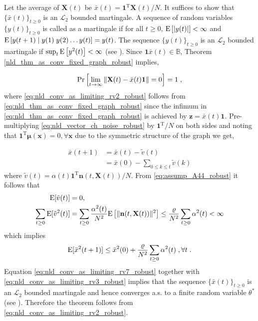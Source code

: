 \documentclass[onecolumn, draft, 12pt]{IEEEtran}
\newcommand{\vrho}{\ensuremath{\varrho}}
\newcommand{\E}{{\rm E}}
\newcommand{\Cs}{\mathbb{B}}
\newcommand{\Ltwo}{\mathcal{L}_{2}}
\newcommand{\onevect}{\mathbf{1}}
\newcommand{\onevectT}{\mathbf{1}^{\mathrm{T}}}
\newcommand{\xbar}{\bar{x}}
\newcommand{\X}{\mathbf{X}}
\newcommand{\xX}{\mathbf{x}}
\newcommand{\Z}{\mathbf{z}}
\newcommand{\cval}{\ensuremath{\theta^{*}}}
\newcommand{\mx}{\mathbf{\boldsymbol\mu}(\mathbf{x})}
\newcommand{\nv}{\mathbf{n}}
\begin{document}
\begin{IEEEproof}
Let the average of $\X(t)$ be $\xbar(t)=\onevectT \X(t) / N$. It suffices to show that $\{\xbar(t)\}_{t \geq 0}$ is an $\Ltwo$ bounded martingale. A sequence of random variables $\{y(t)\}_{t \geq 0}$ is called as a martingale if for all $t \geq 0$, $\E\left[ |y(t)| \right] < \infty$ and $\E\left[ y(t+1) \; | \; y(1) \; y(2) \ldots y(t) \right]=y(t)$. The sequence $\{y(t)\}_{t \geq 0}$ is an $\Ltwo$ bounded martingale if $\sup_{t} \E\left[ y^2(t) \right] < \infty$ (see \cite[pp. 110]{David1991}). Since $\onevect \xbar(t) \in \Cs$, Theorem \ref{nld_thm_as_conv_fixed_graph_robust} implies,

\begin{equation} \label{eq:nld_conv_as_limiting_rv2_robust}
{\rm Pr}\left[ \lim_{t \rightarrow \infty} \| \X(t) -  \xbar(t) \onevect \| =0 \right]=1 \;,
\end{equation}
where \eqref{eq:nld_conv_as_limiting_rv2_robust} follows from \eqref{eq:nld_thm_as_conv_fixed_graph_robust} since the infimum in \eqref{eq:nld_thm_as_conv_fixed_graph_robust} is achieved by $\Z=\xbar(t) \onevect$. Pre-multiplying \eqref{eq:nld_vector_ch_noise_robust} by $\onevectT / N$ on both sides and noting that $\onevectT \mx = 0, \forall \xX$ due to the symmetric structure of the graph we get, 

\begin{align}
\label{eq:nld_conv_as_limiting_rv3_robust}
\xbar(t+1)  & =  \xbar(t) - \tilde{v}(t) \\
\label{eq:nld_conv_as_limiting_rv4_robust}
    & =  \xbar(0) - \displaystyle\sum_{0 \leq k \leq t} \tilde{v}(k) \end{align}
where $\tilde{v}(t) =\alpha(t) \onevectT \nv(t,\X(t)) / N$. From \eqref{eq:assump_A44_robust} it follows that
\begin{align}
\nonumber
\E [\tilde{v}(t)] & =0, \\
\nonumber
\label{eq:nld_conv_as_limiting_rv6_robust}
\displaystyle\sum_{t \geq 0} \E [\tilde{v}^2(t)] &=  \displaystyle\sum_{t \geq 0} \frac{\alpha^2(t)}{N^2} \E \left [ \| \nv(t,\X(t)) \|^2 \right ] \leq  \frac{\vrho}{N^2} \displaystyle\sum_{t \geq 0} \alpha^2(t) < \infty
\end{align}
which implies
\begin{equation} \label{eq:nld_conv_as_limiting_rv7_robust}
\E [\xbar^2(t+1)] \leq \xbar^2(0) + \frac{\vrho}{N^2} \displaystyle\sum_{t \geq 0} \alpha^2(t)\;, \forall t \;.
\end{equation}
Equation \eqref{eq:nld_conv_as_limiting_rv7_robust} together with \eqref{eq:nld_conv_as_limiting_rv3_robust} implies that the sequence $\{\xbar(t)\}_{t \geq 0}$ is an $\Ltwo$ bounded martingale and hence converges a.s. to a finite random variable $\cval$ (see \cite[Theorem 2.6.1]{Nevelson1973}). Therefore the theorem follows from \eqref{eq:nld_conv_as_limiting_rv2_robust}.
\end{IEEEproof}
\end{document}
